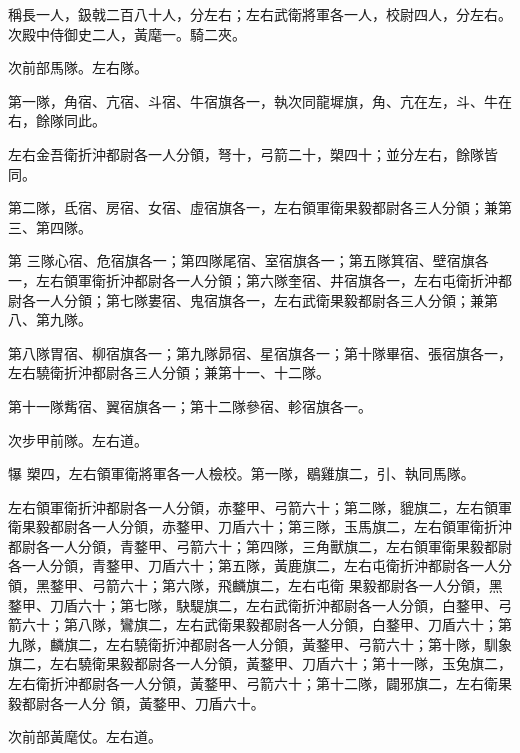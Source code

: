 \begin{pinyinscope}
 稱長一人，鈒戟二百八十人，分左右；左右武衛將軍各一人，校尉四人，分左右。次殿中侍御史二人，黃麾一。騎二夾。



 次前部馬隊。左右隊。



 第一隊，角宿、亢宿、斗宿、牛宿旗各一，執次同龍墀旗，角、亢在左，斗、牛在右，餘隊同此。



 左右金吾衛折沖都尉各一人分領，弩十，弓箭二十，槊四十；並分左右，餘隊皆同。



 第二隊，氐宿、房宿、女宿、虛宿旗各一，左右領軍衛果毅都尉各三人分領；兼第三、第四隊。



 第
 三隊心宿、危宿旗各一；第四隊尾宿、室宿旗各一；第五隊箕宿、壁宿旗各一，左右領軍衛折沖都尉各一人分領；第六隊奎宿、井宿旗各一，左右屯衛折沖都尉各一人分領；第七隊婁宿、鬼宿旗各一，左右武衛果毅都尉各三人分領；兼第八、第九隊。



 第八隊胃宿、柳宿旗各一；第九隊昴宿、星宿旗各一；第十隊畢宿、張宿旗各一，左右驍衛折沖都尉各三人分領；兼第十一、十二隊。



 第十一隊觜宿、翼宿旗各一；第十二隊參宿、軫宿旗各一。



 次步甲前隊。左右道。



 犦
 槊四，左右領軍衛將軍各一人檢校。第一隊，鶡雞旗二，引、執同馬隊。



 左右領軍衛折沖都尉各一人分領，赤鍪甲、弓箭六十；第二隊，貔旗二，左右領軍衛果毅都尉各一人分領，赤鍪甲、刀盾六十；第三隊，玉馬旗二，左右領軍衛折沖都尉各一人分領，青鍪甲、弓箭六十；第四隊，三角獸旗二，左右領軍衛果毅都尉各一人分領，青鍪甲、刀盾六十；第五隊，黃鹿旗二，左右屯衛折沖都尉各一人分領，黑鍪甲、弓箭六十；第六隊，飛麟旗二，左右屯衛
 果毅都尉各一人分領，黑鍪甲、刀盾六十；第七隊，駃騠旗二，左右武衛折沖都尉各一人分領，白鍪甲、弓箭六十；第八隊，鸞旗二，左右武衛果毅都尉各一人分領，白鍪甲、刀盾六十；第九隊，麟旗二，左右驍衛折沖都尉各一人分領，黃鍪甲、弓箭六十；第十隊，馴象旗二，左右驍衛果毅都尉各一人分領，黃鍪甲、刀盾六十；第十一隊，玉兔旗二，左右衛折沖都尉各一人分領，黃鍪甲、弓箭六十；第十二隊，闢邪旗二，左右衛果毅都尉各一人分
 領，黃鍪甲、刀盾六十。



 次前部黃麾仗。左右道。




\end{pinyinscope}
